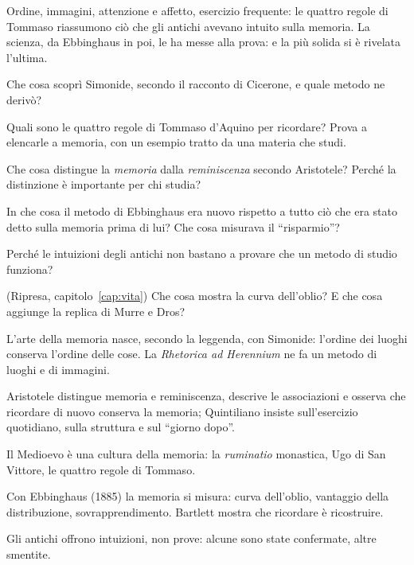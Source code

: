\begin{daricordare}
Ordine, immagini, attenzione e affetto, esercizio frequente: le quattro
regole di Tommaso riassumono ciò che gli antichi avevano intuito sulla
memoria. La scienza, da Ebbinghaus in poi, le ha messe alla prova: e
la più solida si è rivelata l'ultima.
\end{daricordare}

\begin{domande}
  \item Che cosa scoprì Simonide, secondo il racconto di Cicerone, e
        quale metodo ne derivò?
  \item Quali sono le quattro regole di Tommaso d'Aquino per ricordare?
        Prova a elencarle a memoria, con un esempio tratto da una
        materia che studi.
  \item Che cosa distingue la \emph{memoria} dalla
        \emph{reminiscenza} secondo Aristotele? Perché la distinzione
        è importante per chi studia?
  \item In che cosa il metodo di Ebbinghaus era nuovo rispetto a tutto
        ciò che era stato detto sulla memoria prima di lui? Che cosa
        misurava il \enquote{risparmio}?
  \item Perché le intuizioni degli antichi non bastano a provare che un
        metodo di studio funziona?
  \item (Ripresa, capitolo~\ref{cap:vita}) Che cosa mostra la curva
        dell'oblio? E che cosa aggiunge la replica di Murre e Dros?
\end{domande}

\begin{sintesi}
  \item L'arte della memoria nasce, secondo la leggenda, con Simonide:
        l'ordine dei luoghi conserva l'ordine delle cose. La
        \emph{Rhetorica ad Herennium} ne fa un metodo di luoghi e di
        immagini.
  \item Aristotele distingue memoria e reminiscenza, descrive le
        associazioni e osserva che ricordare di nuovo conserva la
        memoria; Quintiliano insiste sull'esercizio quotidiano, sulla
        struttura e sul \enquote{giorno dopo}.
  \item Il Medioevo è una cultura della memoria: la \emph{ruminatio}
        monastica, Ugo di San Vittore, le quattro regole di Tommaso.
  \item Con Ebbinghaus (1885) la memoria si misura: curva dell'oblio,
        vantaggio della distribuzione, sovrapprendimento. Bartlett
        mostra che ricordare è ricostruire.
  \item Gli antichi offrono intuizioni, non prove: alcune sono state
        confermate, altre smentite.
\end{sintesi}

\finecapitolo
